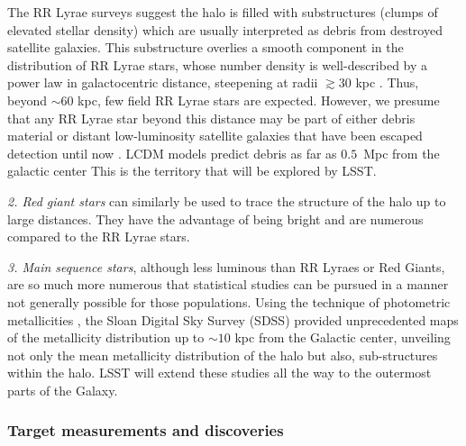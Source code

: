 The RR Lyrae surveys suggest the halo is filled with substructures
(clumps of elevated stellar density) which are usually interpreted as
debris from destroyed satellite galaxies. This substructure overlies a
smooth component in the distribution of RR Lyrae stars, whose number density is well-described by a power law in galactocentric distance,
steepening at radii $\gtrsim 30$ kpc \citep{zinn14}.  Thus, beyond
$\sim 60$ kpc, few field RR Lyrae stars are expected. However, we
presume that any RR Lyrae star beyond this distance may be part of
either debris material or distant low-luminosity satellite galaxies
that have been escaped detection until now \citep{sesar14,baker15}.
LCDM models predict debris as far as $0.5$~Mpc from the galactic
center This is the territory that will be explored by LSST.

{\it 2. Red giant stars} can similarly be used to trace the structure
of the halo up to large distances. They have the advantage of being
bright and are numerous compared to the RR Lyrae stars.

{\it 3. Main sequence stars}, although less luminous than RR Lyraes or
Red Giants, are so much more numerous that statistical studies can be
pursued in a manner not generally possible for those populations.
Using the technique of photometric metallicities \citep{ivezic08}, the
Sloan Digital Sky Survey (SDSS) provided unprecedented maps of the
metallicity distribution up to $\sim 10$ kpc from the Galactic center,
unveiling not only the mean metallicity distribution of the halo but
also, sub-structures within the halo. LSST will extend these studies
all the way to the outermost parts of the Galaxy.


\subsubsection{Target measurements and discoveries}
\label{sec:\secname:MW_Halo_targets}


